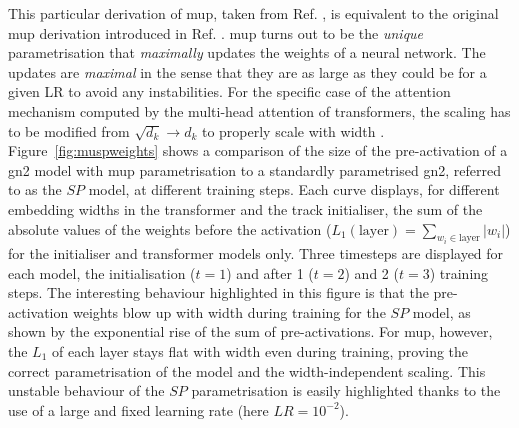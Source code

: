 This particular derivation of \gls{mup}, taken from Ref. \cite{yang2021tuning}, is equivalent to the original \gls{mup} derivation introduced in Ref. \cite{pmlr-v139-yang21c}. \gls{mup} turns out to be the \textit{unique} parametrisation that \textit{maximally} updates the weights of a neural network. The updates are \textit{maximal} in the sense that they are as large as they could be for a given LR to avoid any instabilities. For the specific case of the attention mechanism computed by the multi-head attention of transformers, the scaling has to be modified from $\sqrt{d_k} \rightarrow d_k$ to properly scale with width \cite{yang2021tuning}. Figure~\ref{fig:muspweights} shows a comparison of the size of the pre-activation of a \gls{gn2} model with \gls{mup} parametrisation to a standardly parametrised \gls{gn2}, referred to as the $SP$ model, at different training steps. Each curve displays, for different embedding widths in the transformer and the track initialiser, the sum of the absolute values of the weights before the activation ($L_1(\textrm{layer}) = \sum_{w_i \in \textrm{layer}} |w_i|$) for the initialiser and transformer models only. Three timesteps are displayed for each model, the initialisation ($t=1$) and after 1 ($t=2$) and 2 ($t=3$) training steps. The interesting behaviour highlighted in this figure is that the pre-activation weights blow up with width during training for the $SP$ model, as shown by the exponential rise of the sum of pre-activations. For \gls{mup}, however, the $L_1$ of each layer stays flat with width even during training, proving the correct parametrisation of the model and the width-independent scaling. This unstable behaviour of the $SP$ parametrisation is easily highlighted thanks to the use of a large and fixed learning rate (here $LR = 10^{-2}$). \\

